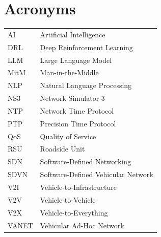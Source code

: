 \section*{Acronyms}

\begin{tabular}{ll}
AI & Artificial Intelligence \\
DRL & Deep Reinforcement Learning \\
LLM & Large Language Model \\
MitM & Man-in-the-Middle \\
NLP & Natural Language Processing \\
NS3 & Network Simulator 3 \\
NTP & Network Time Protocol \\
PTP & Precision Time Protocol \\
QoS & Quality of Service \\
RSU & Roadside Unit \\
SDN & Software-Defined Networking \\
SDVN & Software-Defined Vehicular Network \\
V2I & Vehicle-to-Infrastructure \\
V2V & Vehicle-to-Vehicle \\
V2X & Vehicle-to-Everything \\
VANET & Vehicular Ad-Hoc Network \\
\end{tabular}

\newpage